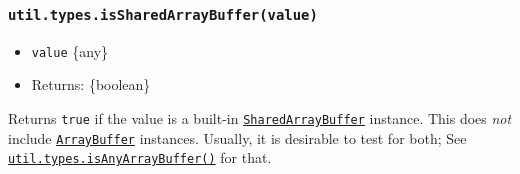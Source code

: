 \begin{Shaded}
\begin{Highlighting}[]
  \OperatorTok{=}  \NormalTok{()}\OperatorTok{;}
\NormalTok{(}\NormalTok{())}\OperatorTok{;}  
\NormalTok{(}\NormalTok{())}\OperatorTok{;}  
\NormalTok{(}\NormalTok{())}\OperatorTok{;}  
\NormalTok{(}\NormalTok{[}\NormalTok{]())}\OperatorTok{;}  
\end{Highlighting}
\end{Shaded}

\subsubsection{\texorpdfstring{\texttt{util.types.isSharedArrayBuffer(value)}}{util.types.isSharedArrayBuffer(value)}}\label{util.types.issharedarraybuffervalue}

\begin{itemize}
\tightlist
\item
  \texttt{value} \{any\}
\item
  Returns: \{boolean\}
\end{itemize}

Returns \texttt{true} if the value is a built-in
\href{https://developer.mozilla.org/en-US/docs/Web/JavaScript/Reference/Global_Objects/SharedArrayBuffer}{\texttt{SharedArrayBuffer}}
instance. This does \emph{not} include
\href{https://developer.mozilla.org/en-US/docs/Web/JavaScript/Reference/Global_Objects/ArrayBuffer}{\texttt{ArrayBuffer}}
instances. Usually, it is desirable to test for both; See
\hyperref[utiltypesisanyarraybuffervalue]{\texttt{util.types.isAnyArrayBuffer()}}
for that.

\begin{Shaded}
\begin{Highlighting}[]
\NormalTok{(} \NormalTok{())}\OperatorTok{;}  
\NormalTok{(} \NormalTok{())}\OperatorTok{;}  
\end{Highlighting}
\end{Shaded}

